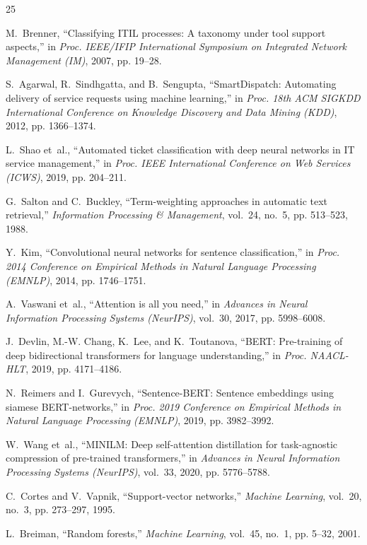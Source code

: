 \documentclass[conference]{IEEEtran}
\begin{document}
\begin{thebibliography}{25}

M.~Brenner, ``Classifying ITIL processes: A taxonomy under tool support aspects,'' in \emph{Proc. IEEE/IFIP International Symposium on Integrated Network Management (IM)}, 2007, pp. 19--28.

S.~Agarwal, R.~Sindhgatta, and B.~Sengupta, ``SmartDispatch: Automating delivery of service requests using machine learning,'' in \emph{Proc. 18th ACM SIGKDD International Conference on Knowledge Discovery and Data Mining (KDD)}, 2012, pp. 1366--1374.

L.~Shao et~al., ``Automated ticket classification with deep neural networks in IT service management,'' in \emph{Proc. IEEE International Conference on Web Services (ICWS)}, 2019, pp. 204--211.

G.~Salton and C.~Buckley, ``Term-weighting approaches in automatic text retrieval,'' \emph{Information Processing \& Management}, vol.~24, no.~5, pp. 513--523, 1988.

Y.~Kim, ``Convolutional neural networks for sentence classification,'' in \emph{Proc. 2014 Conference on Empirical Methods in Natural Language Processing (EMNLP)}, 2014, pp. 1746--1751.

A.~Vaswani et~al., ``Attention is all you need,'' in \emph{Advances in Neural Information Processing Systems (NeurIPS)}, vol.~30, 2017, pp. 5998--6008.

J.~Devlin, M.-W. Chang, K.~Lee, and K.~Toutanova, ``BERT: Pre-training of deep bidirectional transformers for language understanding,'' in \emph{Proc. NAACL-HLT}, 2019, pp. 4171--4186.

N.~Reimers and I.~Gurevych, ``Sentence-BERT: Sentence embeddings using siamese BERT-networks,'' in \emph{Proc. 2019 Conference on Empirical Methods in Natural Language Processing (EMNLP)}, 2019, pp. 3982--3992.

W.~Wang et~al., ``MINILM: Deep self-attention distillation for task-agnostic compression of pre-trained transformers,'' in \emph{Advances in Neural Information Processing Systems (NeurIPS)}, vol.~33, 2020, pp. 5776--5788.

C.~Cortes and V.~Vapnik, ``Support-vector networks,'' \emph{Machine Learning}, vol.~20, no.~3, pp. 273--297, 1995.

L.~Breiman, ``Random forests,'' \emph{Machine Learning}, vol.~45, no.~1, pp. 5--32, 2001.


\end{thebibliography}
\end{document}

